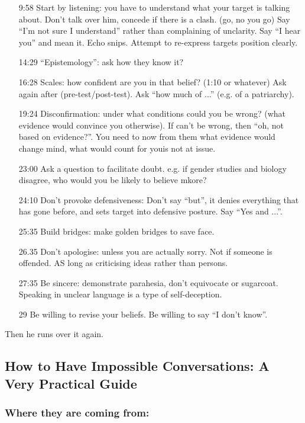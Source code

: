 \documentclass[10pt,titlepage]{book}
\begin{document}
\begin{itemize}
\item[9:58] Start by listening: you have to understand what your target is talking about.
  Don't talk over him, concede if there is a clash. (go, no you go)
  Say ``I'm not sure I understand'' rather than complaining of unclarity.
  Say ``I hear you'' and mean it.
  Echo snips.
  Attempt to re-express targets position clearly.
\item[14:29] ``Epistemology'': ask how they know it?
\item[16:28] Scales: how confident are you in that belief? (1:10 or whatever)
  Ask again after (pre-test/post-test).
  Ask ``how much of ...'' (e.g. of a patriarchy).
\item[19:24] Disconfirmation: under what conditions could you be wrong?
  (what evidence would convince you otherwise).
  If can't be wrong, then ``oh, not based on evidence?''.
  You need to now from them what evidence would change mind, what would count for youis not at issue.
\item[23:00] Ask a question to facilitate doubt.
  e.g. if gender studies and biology disagree, who would you be likely to believe mkore?
\item[24:10] Don't provoke defensiveness: Don't say ``but'', it denies everything that has gone before, and sets target into defensive posture.
  Say ``Yes and ...''.
\item[25:35] Build bridges: make golden bridges to save face.
\item[26.35] Don't apologise: unless you are actually sorry. Not if someone is offended.  AS long as criticising ideas rather than persons.
\item[27:35] Be sincere: demonstrate parahesia, don't equivocate or sugarcoat.
  Speaking in unclear language is a type of self-deception.
  \item[29] Be willing to revise your beliefs.  Be willing to say ``I don't know''.
\end{itemize}

Then he runs over it again.

\subsection{How to Have Impossible Conversations: A Very Practical Guide}

\cite{boghossian-manual,boghossian-conversations}

\subsubsection{Where they are coming from:}
\end{document}
